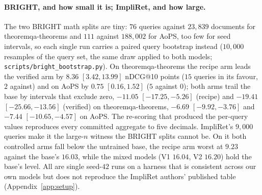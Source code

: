 \paragraph{BRIGHT, and how small it is; ImpliRet, and how large.}The two BRIGHT math splits are tiny: $76$ queries against $23{,}839$ documents for theoremqa-theorems and $111$ against $188{,}002$ for AoPS, too few for seed intervals, so each single run carries a paired query bootstrap instead ($10{,}000$ resamples of the query set, the same draw applied to both models; \texttt{scripts/bright\_bootstrap.py}). On theoremqa-theorems the recipe arm leads the verified arm by $8.36$ $[3.42, 13.99]$ nDCG@10 points ($15$ queries in its favour, $2$ against) and on AoPS by $0.75$ $[0.16, 1.52]$ ($5$ against $0$); both arms trail the base by intervals that exclude zero, $-11.05$ $[-17.25, -5.26]$ (recipe) and $-19.41$ $[-25.66, -13.56]$ (verified) on theoremqa-theorems, $-6.69$ $[-9.92, -3.76]$ and $-7.44$ $[-10.65, -4.57]$ on AoPS. The re-scoring that produced the per-query values reproduces every committed aggregate to five decimals. ImpliRet's $9{,}000$ queries make it the large-$n$ witness the BRIGHT splits cannot be. On it both controlled arms fall below the untrained base, the recipe arm worst at $9.23$ against the base's $16.03$, while the mixed models (V1 $16.04$, V2 $16.20$) hold the base's level. All are single seed-$42$ runs on a harness that is consistent across our own models but does not reproduce the ImpliRet authors' published table (Appendix~\ref{app:setup}).


